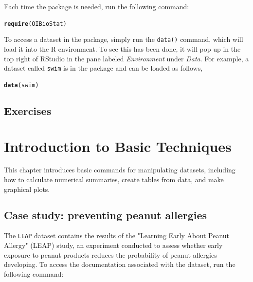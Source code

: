 \documentclass{report}\usepackage[]{graphicx}\usepackage[]{color}
\makeatletter
\newcommand{\hlstd}[1]{\textcolor[rgb]{0.345,0.345,0.345}{#1}}%
\newcommand{\hlkwd}[1]{\textcolor[rgb]{0.737,0.353,0.396}{\textbf{#1}}}%
\newenvironment{kframe}{%
 \def\at@end@of@kframe{}%
 \ifinner\ifhmode%
  \def\at@end@of@kframe{\end{minipage}}%
  \begin{minipage}{\columnwidth}%
 \fi\fi%
 \def\FrameCommand##1{\hskip\@totalleftmargin \hskip-\fboxsep
 \colorbox{shadecolor}{##1}\hskip-\fboxsep
     \hskip-\linewidth \hskip-\@totalleftmargin \hskip\columnwidth}%
 \MakeFramed {\advance\hsize-\width
   \@totalleftmargin\z@ \linewidth\hsize
   \@setminipage}}%
 {\par\unskip\endMakeFramed%
 \at@end@of@kframe}
\newenvironment{knitrout}{}{} %
\makeatother
\begin{document}
Each time the package is needed, run the following command: 
\begin{knitrout}
\color{fgcolor}\begin{kframe}
\begin{alltt}
\hlkwd{require}\hlstd{(OIBioStat)}
\end{alltt}
\end{kframe}
\end{knitrout}

To access a dataset in the package, simply run the \texttt{data()} command, which will load it into the \textsf{R} environment.  To see this has been done, it will pop up in the top right of \textsf{RStudio} in the pane labeled \textit{Environment} under \textit{Data}.  For example, a dataset called \texttt{swim} is in the package and can be loaded as follows, 
\begin{knitrout}
\color{fgcolor}\begin{kframe}
\begin{alltt}
\hlkwd{data}\hlstd{(swim)}
\end{alltt}
\end{kframe}
\end{knitrout}



\section{Exercises}

\newpage
\chapter{Introduction to Basic Techniques}
\minitoc

\vspace{0.5cm} 

This chapter introduces basic commands for manipulating datasets, including how to calculate numerical summaries, create tables from data, and make graphical plots. 

\section{Case study: preventing peanut allergies}

The \texttt{LEAP} dataset contains the results of the "Learning Early About Peanut Allergy" (LEAP) study, an experiment conducted to assess whether early exposure to peanut products reduces the probability of peanut allergies developing. To access the documentation associated with the dataset, run the following command: 
\end{document}
